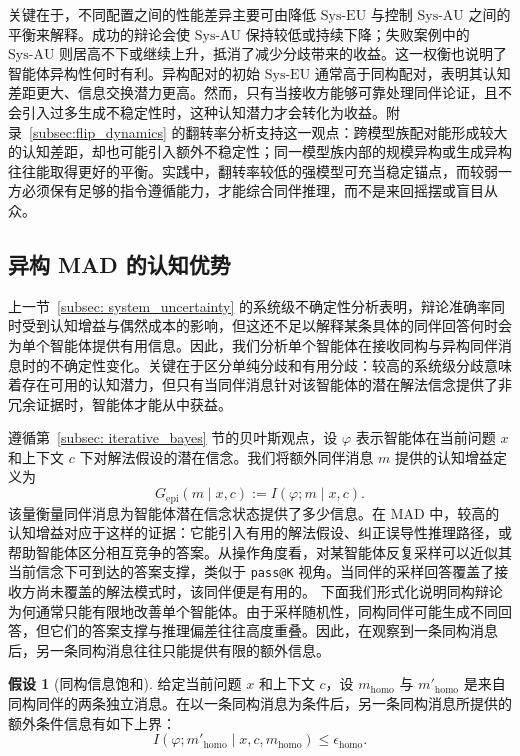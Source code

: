 \documentclass{article}
\theoremstyle{plain}
\theoremstyle{definition}
\newtheorem{assumption}[theorem]{假设}
\theoremstyle{remark}
\begin{document}
关键在于，不同配置之间的性能差异主要可由降低 $\mathrm{Sys\mbox{-}EU}$ 与控制 $\mathrm{Sys\mbox{-}AU}$ 之间的平衡来解释。成功的辩论会使 $\mathrm{Sys\mbox{-}AU}$ 保持较低或持续下降；失败案例中的 $\mathrm{Sys\mbox{-}AU}$ 则居高不下或继续上升，抵消了减少分歧带来的收益。这一权衡也说明了智能体异构性何时有利。异构配对的初始 $\mathrm{Sys\mbox{-}EU}$ 通常高于同构配对，表明其认知差距更大、信息交换潜力更高。然而，只有当接收方能够可靠处理同伴论证，且不会引入过多生成不稳定性时，这种认知潜力才会转化为收益。附录~\ref{subsec:flip_dynamics} 的翻转率分析支持这一观点：跨模型族配对能形成较大的认知差距，却也可能引入额外不稳定性；同一模型族内部的规模异构或生成异构往往能取得更好的平衡。实践中，翻转率较低的强模型可充当稳定锚点，而较弱一方必须保有足够的指令遵循能力，才能综合同伴推理，而不是来回摇摆或盲目从众。

\subsection{异构 MAD 的认知优势}\label{subsec:agent_uncertainty}
上一节~\ref{subsec: system_uncertainty} 的系统级不确定性分析表明，辩论准确率同时受到认知增益与偶然成本的影响，但这还不足以解释某条具体的同伴回答何时会为单个智能体提供有用信息。因此，我们分析单个智能体在接收同构与异构同伴消息时的不确定性变化。关键在于区分单纯分歧和有用分歧：较高的系统级分歧意味着存在可用的认知潜力，但只有当同伴消息针对该智能体的潜在解法信念提供了非冗余证据时，智能体才能从中获益。


遵循第~\ref{subsec: iterative_bayes} 节的贝叶斯观点，设 $\varphi$ 表示智能体在当前问题 $x$ 和上下文 $c$ 下对解法假设的潜在信念。我们将额外同伴消息 $m$ 提供的认知增益定义为
\[
G_{\mathrm{epi}}(m \mid x,c) := I(\varphi; m \mid x,c).
\]
该量衡量同伴消息为智能体潜在信念状态提供了多少信息。在 MAD 中，较高的认知增益对应于这样的证据：它能引入有用的解法假设、纠正误导性推理路径，或帮助智能体区分相互竞争的答案。从操作角度看，对某智能体反复采样可以近似其当前信念下可到达的答案支撑，类似于 \texttt{pass@K} 视角。当同伴的采样回答覆盖了接收方尚未覆盖的解法模式时，该同伴便是有用的。
下面我们形式化说明同构辩论为何通常只能有限地改善单个智能体。由于采样随机性，同构同伴可能生成不同回答，但它们的答案支撑与推理偏差往往高度重叠。因此，在观察到一条同构消息后，另一条同构消息往往只能提供有限的额外信息。
\begin{assumption}[同构信息饱和]\label{ass:homo_saturation}
给定当前问题 $x$ 和上下文 $c$，设 $m_{\mathrm{homo}}$ 与 $m'_{\mathrm{homo}}$ 是来自同构同伴的两条独立消息。在以一条同构消息为条件后，另一条同构消息所提供的额外条件信息有如下上界：
\[
I(\varphi; m'_{\mathrm{homo}} \mid x,c,m_{\mathrm{homo}})
\le
\epsilon_{\mathrm{homo}}.
\]
\end{assumption}
\end{document}
